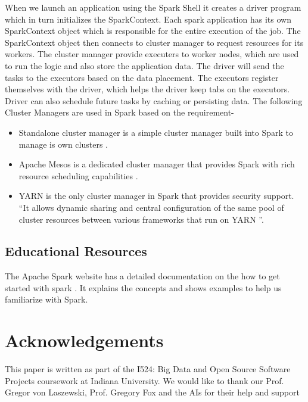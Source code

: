 \documentclass[9pt,twocolumn,twoside]{../../styles/osajnl}
\begin{document}
When we launch an application using the Spark Shell it creates a driver program which in turn initializes the SparkContext. Each spark application has its own SparkContext object which is responsible for the entire execution of the job. The SparkContext  object then connects to cluster manager to request resources for its workers. The cluster manager provide executers to worker nodes, which are used to run the logic and also store the application data. The driver will send the tasks to the executors based on the data placement. The executors register themselves with the driver, which helps the driver keep tabs on the executors. Driver can also schedule future tasks by caching or persisting data.
The following Cluster Managers are used in Spark based on the requirement-
\begin{itemize}
    \item Standalone cluster manager is a simple cluster manager built into Spark to manage is own clusters \cite{www-spark-cluster}.
    \item Apache Mesos is a dedicated cluster manager that provides Spark with rich resource scheduling capabilities \cite{www-spark-cluster}.
    \item YARN is the only cluster manager in Spark that provides security support. “It allows dynamic sharing and central configuration of the same pool of cluster resources between various frameworks that run on YARN \cite{www-spark-2}”.
\end{itemize}

\subsection{Educational Resources}
 The Apache Spark website has a detailed documentation on the how to get started with spark \cite{www-apache-spark}. It explains the concepts and shows examples to help us familiarize with Spark.
 
\section*{Acknowledgements}

This paper is written as part of the I524: Big Data and Open Source Software Projects coursework at Indiana University. We would like to thank our Prof. Gregor von Laszewski, Prof. Gregory Fox and the AIs for their help and support



 
\end{document}
